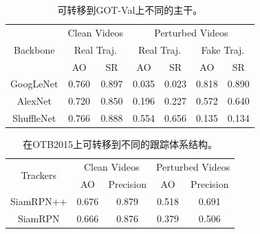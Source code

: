 \begin{table}
\centering
\footnotesize
\tabcolsep=2.0pt
\begin{tabular}{c|cc|cc|cc} 
\toprule
\multirow{3}{*}[-6pt]{Backbone} & \multicolumn{2}{c|}{Clean Videos}    & \multicolumn{4}{c}{Perturbed Videos}                                        \\ 
\cmidrule{2-7}
                          & \multicolumn{2}{c|}{Real Traj.} & \multicolumn{2}{c|}{Real Traj.} & \multicolumn{2}{c}{Fake Traj.}  \\ 
\cmidrule{2-7}
                          & AO    & SR                           & AO    & SR                           & AO    & SR                           \\ 
\midrule
GoogLeNet                 & 0.760 & 0.897                        & 0.035 & 0.023                        & 0.818 & 0.890                        \\
AlexNet                   & 0.720 & 0.850                        & 0.196 & 0.227                        & 0.572 & 0.640                        \\
ShuffleNet                & 0.766 & 0.888                        & 0.554 & 0.656                        & 0.135 & 0.134                        \\
\bottomrule
\end{tabular}
\caption{可转移到GOT-Val上不同的主干。}
\label{tab:backbone}
\end{table}

\begin{table}
\centering
\footnotesize
\tabcolsep=2.0pt
\begin{tabular}{c|cc|cc} 
\toprule
\multirow{2}{*}[-2pt]{Trackers} & \multicolumn{2}{c|}{Clean Videos} & \multicolumn{2}{c}{Perturbed Videos}  \\
\cmidrule{2-5}
                          & AO & Precision              & AO & Precision                   \\
\midrule
SiamRPN++                 & 0.676   & 0.879                  & 0.518   & 0.691                       \\
SiamRPN                   & 0.666   & 0.876                  & 0.379   & 0.506                       \\
\bottomrule
\end{tabular}
\caption{在OTB2015上可转移到不同的跟踪体系结构。}
\label{tab:arch}
\end{table}


